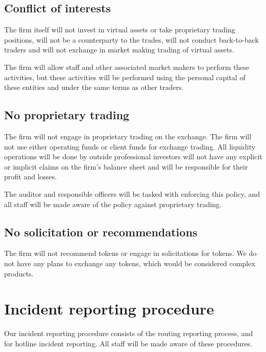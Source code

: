 \subsection{Conflict of interests}
The firm itself will not invest in virtual assets or take proprietary
trading positions, will not be a counterparty to the trades, will not
conduct back-to-back traders and will not exchange in market making
trading of virtual assets.

The firm will allow staff and other associated market makers to
perform these activities, but these activities will be performed using
the personal capital of these entities and under the same terms as
other traders.

\subsection{No proprietary trading}

The firm will not engage in proprietary trading on the exchange.  The firm will not use either operating funds or client funds for exchange
trading.  All liquidity operations will be done by outside
professional investors will not have any explicit or implicit claims
on the firm's balance sheet and will be responsible for their
profit and losses.

The auditor and responsible officers will be tasked with enforcing
this policy, and all staff will be made aware of the policy against
proprietary trading.

\subsection{No solicitation or recommendations}
The firm will not recommend tokens or engage in solicitations for
tokens.  We do not have any plans to exchange any tokens, which would
be considered complex products.

\section{Incident reporting procedure}

Our incident reporting procedure consists of the routing reporting
process, and for hotline incident reporting.  All staff will be
made aware of these procedures.

